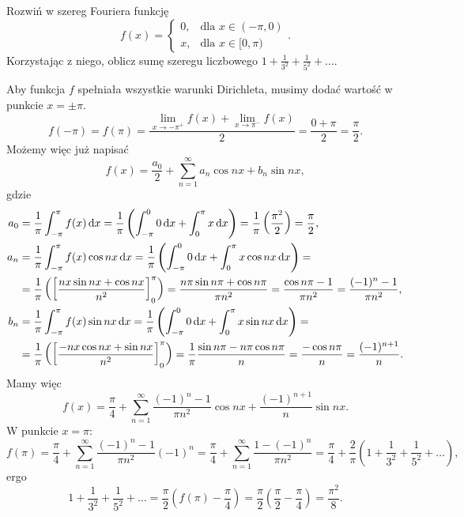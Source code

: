 \begin{example}
    Rozwiń w szereg Fouriera funkcję
    \[ f(x) = \begin{cases}
        0, & \text{dla } x \in (-\pi, 0) \\
        x, & \text{dla } x \in [0, \pi)
    \end{cases}. \]
    Korzystając z niego, oblicz sumę szeregu liczbowego $1 + \frac{1}{3^2} + \frac{1}{5^2} + \ldots$.
\end{example}
\begin{solution}
    Aby funkcja $f$ spełniała wszystkie warunki Dirichleta, musimy dodać wartość w punkcie $x = \pm \pi$.
    \[ f(-\pi) = f(\pi) = \frac{\lim\limits_{x\to -\pi^+}f(x) + \lim\limits_{x\to \pi^-}f(x)}{2} = \frac{0 + \pi}{2} = \frac{\pi}{2}. \]
    Możemy więc już napisać
    \[ f(x) = \frac{a_0}{2} + \sum_{n=1}^\infty a_n\cos nx + b_n\sin nx, \]
    gdzie
    \begin{align*}
        a_0 &= \frac{1}{\pi}\int_{-\pi}^\pi f(x) \d x = \frac{1}{\pi}\left(\int_{-\pi}^0 0 \d x + \int_0^\pi x \d x\right) = \frac{1}{\pi}\left(\frac{\pi^2}{2}\right) = \frac{\pi}{2}, \\
        a_n &= \frac{1}{\pi}\int_{-\pi}^\pi f(x)\cos{nx} \d x = \frac{1}{\pi}\left(\int_{-\pi}^0 0 \d x + \int_0^\pi x \cos{nx} \d x\right) = \\
            &= \frac{1}{\pi}\left(\left[\frac{nx\sin{nx} + \cos{nx}}{n^2}\right]_0^\pi\right) = \frac{n\pi\sin{n\pi} + \cos{n\pi}}{\pi n^2} = \frac{\cos{n\pi} - 1}{\pi n^2} = \frac{(-1)^n - 1}{\pi n^2}, \\
        b_n &= \frac{1}{\pi}\int_{-\pi}^\pi f(x)\sin{nx} \d x = \frac{1}{\pi}\left(\int_{-\pi}^0 0 \d x + \int_0^\pi x \sin{nx} \d x\right) = \\
            &= \frac{1}{\pi}\left(\left[\frac{-nx\cos{nx} + \sin{nx}}{n^2}\right]_0^\pi\right) = \frac{1}{\pi}\frac{\sin{n\pi} - n\pi\cos{n\pi}}{n} = \frac{-\cos{n\pi}}{n} = \frac{(-1)^{n+1}}{n}.
    \end{align*}
    Mamy więc
    \[ f(x) = \frac{\pi}{4} + \sum_{n=1}^\infty \frac{(-1)^n - 1}{\pi n^2}\cos{nx} + \frac{(-1)^{n+1}}{n}\sin{nx}. \]
    W punkcie $x = \pi$:
    \[ f(\pi) = \frac{\pi}{4} + \sum_{n=1}^\infty \frac{(-1)^n - 1}{\pi n^2}(-1)^n = \frac{\pi}{4} + \sum_{n=1}^\infty \frac{1 - (-1)^n}{\pi n^2} = \frac{\pi}{4} + \frac{2}{\pi}\left(1 + \frac{1}{3^2} + \frac{1}{5^2} + \ldots\right), \]
    ergo
    \[ 1 + \frac{1}{3^2} + \frac{1}{5^2} + \ldots = \frac{\pi}{2}\left(f(\pi) - \frac{\pi}{4}\right) = \frac{\pi}{2}\left(\frac{\pi}{2} - \frac{\pi}{4}\right) = \frac{\pi^2}{8}. \]
\end{solution}


